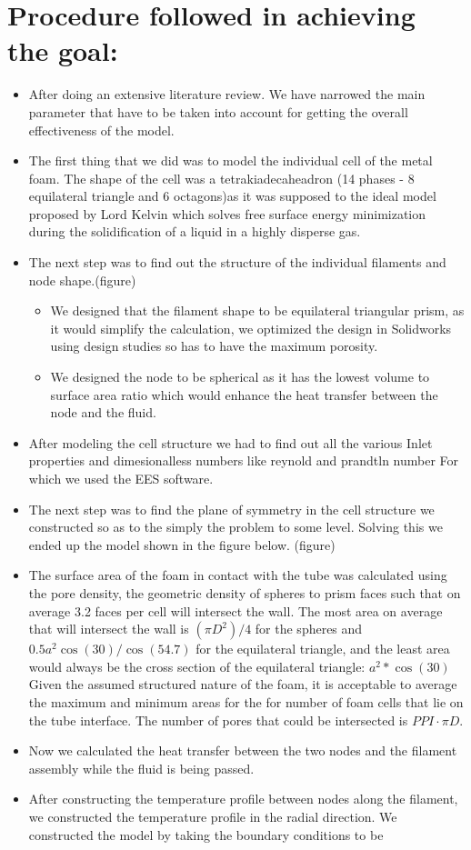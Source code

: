 \documentclass[compileTAMUreport.tex]{subfiles}
\begin{document}
\section{Procedure followed in achieving the goal:}
\begin{itemize}
\item After doing an extensive literature review. We have narrowed the main parameter that have to be taken into account for getting the overall effectiveness of the model.
\item The first thing that we did was to model the individual cell of the metal foam. The shape of the cell was a tetrakiadecaheadron (14 phases - 8 equilateral triangle and 6 octagons)as it was supposed to the ideal model proposed by Lord Kelvin which solves free surface energy minimization during the solidification of a liquid in a highly disperse gas.
\item The next step was to find out the structure of the individual filaments and node shape.(figure)
\begin{itemize}

\item We designed that the filament shape to be equilateral triangular prism, as it would simplify the calculation, we optimized the design in Solidworks using design studies so has to have the maximum porosity.
\item We designed the node to be spherical as it has the lowest volume to surface area ratio which would enhance the heat transfer between the node and the fluid.
\end{itemize}
\item After modeling the cell structure we had to find out all the various Inlet properties and dimesionalless numbers like reynold and prandtln number For which we used the EES software.
\item	The next step was to find the plane of symmetry in the cell structure we constructed so as to the simply the problem to some level. Solving this we ended up the model shown in the figure below. (figure)
\item The surface area of the foam in contact with the tube was calculated using the pore density, the geometric density of spheres to prism faces such that on average 3.2 faces per cell will intersect the wall. The most area on average that will intersect the wall is $(\pi D^2)/4$ for the spheres and $0.5 a^2 \cos (30)/ \cos(54.7)$ for the equilateral triangle, and the least area would always be the cross section of the equilateral triangle: $a^2 * \cos(30) $ Given the assumed structured nature of the foam, it is acceptable to average the maximum and minimum areas for the for number of foam cells that lie on the tube interface. The number of pores that could be intersected is $PPI\cdot\pi D$. 
\item	Now we calculated the heat transfer between the two nodes and the filament assembly while the fluid is being passed.
\item After constructing the temperature profile between nodes along the filament, we constructed the temperature profile in the radial direction. We constructed the model by taking the boundary conditions to be 
\begin{itemize}


\end{itemize}
\end{itemize}
\end{document}
